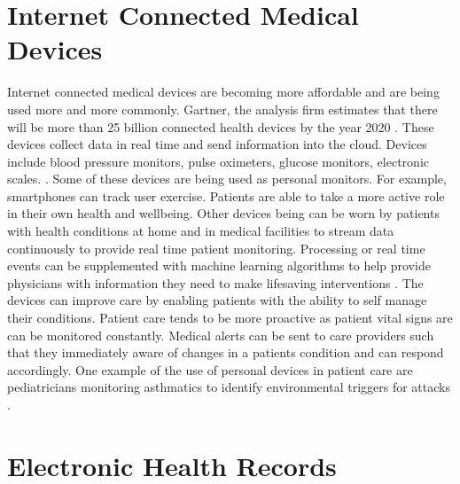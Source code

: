 \documentclass[sigconf]{acmart}
\begin{document}
\section{Internet Connected Medical Devices}
Internet connected medical devices are becoming more affordable and are being used more and more commonly.  Gartner, the analysis firm estimates that there will be more than 25 billion connected health devices by the year 2020 \cite{www-google-HlthCat}. These devices collect data in real time and send information into the cloud. Devices include blood pressure monitors, pulse oximeters, glucose monitors, electronic scales. \cite{www-google-HlthCat}.  Some of these devices are being used as personal monitors. For example, smartphones can track user exercise.  Patients are able to take a more active role in their own health and wellbeing.  Other devices being can be worn by patients with health conditions at home and in medical facilities to stream data continuously to provide real time patient monitoring.  Processing or real time events can be supplemented with machine learning algorithms to help provide physicians with information they need to make lifesaving interventions \cite{www-google-McDonaldMcDonald}.  The devices can improve care by enabling patients with the ability to self manage their conditions. Patient care tends to be more proactive as patient vital signs are can be monitored constantly. Medical alerts can be sent to care providers such that they immediately aware of changes in a patients condition and can respond accordingly. One example of the use of personal devices in patient care are pediatricians monitoring asthmatics to identify environmental triggers for attacks \cite{CIO}.

\section{Electronic Health Records}
\end{document}
